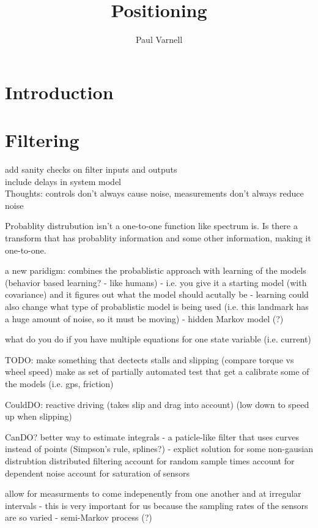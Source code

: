 \documentclass[a4paper,10pt]{report}
\title{Positioning}
\author{Paul Varnell}
\begin{document}
\maketitle

\chapter{Introduction}

\chapter{Filtering}
add sanity checks on filter inputs and outputs \\
include delays in system model \\



	Thoughts:
controls don't always cause noise, measurements don't always reduce noise

Probablity distrubution isn't a one-to-one function like spectrum is. Is there a transform that has probablity information and some other information, making it one-to-one.

a new paridigm: combines the probablistic approach with learning of the models (behavior based learning? - like humans)
 - i.e. you give it a starting model (with covariance) and it figures out what the model should acutally be
 - learning could also change what type of probablistic model is being used (i.e. this landmark has a huge amount of noise, so it must be moving)
 - hidden Markov model (?)

what do you do if you have multiple equations for one state variable (i.e. current)


	TODO:
make something that dectects stalls and slipping (compare torque vs wheel speed)
make as set of partially automated test that get a calibrate some of the models (i.e. gps, friction)

	CouldDO:
reactive driving (takes slip and drag into account) (low down to speed up when slipping)

	CanDO?
better way to estimate integrals
 - a paticle-like filter that uses curves instead of points (Simpson's rule, splines?)
 - explict solution for some non-gausian distrubtion
distributed filtering
account for random sample times
account for dependent noise
account for saturation of sensors

allow for measurments to come indepenently from one another and at irregular intervals
 - this is very important for us because the sampling rates of the sensors are so varied
 - semi-Markov process (?)
\end{document}
